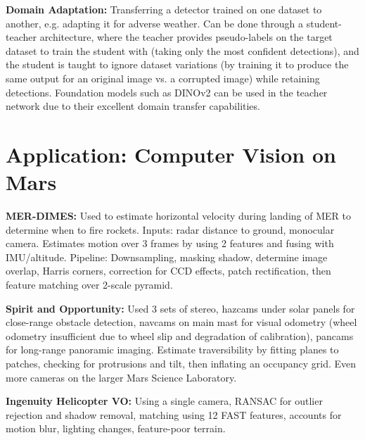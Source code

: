 \documentclass[twocolumn, 10pt]{extarticle}
\begin{document}
\textbf{Domain Adaptation:} Transferring a detector trained on one dataset to another, e.g. adapting it for adverse
weather. Can be done through a student-teacher architecture, where the teacher provides pseudo-labels on the target
dataset to train the student with (taking only the most confident detections), and the student is taught to ignore
dataset variations (by training it to produce the same output for an original image vs. a corrupted image) while
retaining detections. Foundation models such as DINOv2 can be used in the teacher network due to their excellent domain
transfer capabilities.

\section{Application: Computer Vision on Mars} %

\textbf{MER-DIMES:} Used to estimate horizontal velocity during landing of MER to determine when to fire rockets.
Inputs: radar distance to ground, monocular camera. Estimates motion over 3 frames by using 2 features and fusing with
IMU/altitude. Pipeline: Downsampling, masking shadow, determine image overlap, Harris corners, correction for CCD
effects, patch rectification, then feature matching over 2-scale pyramid.

\textbf{Spirit and Opportunity:} Used 3 sets of stereo, hazcams under solar panels for close-range obstacle detection,
navcams on main mast for visual odometry (wheel odometry insufficient due to wheel slip and degradation of calibration),
pancams for long-range panoramic imaging. Estimate traversibility by fitting planes to patches, checking for protrusions
and tilt, then inflating an occupancy grid. Even more cameras on the larger Mars Science Laboratory.

\textbf{Ingenuity Helicopter VO:} Using a single camera, RANSAC for outlier rejection and shadow removal, matching using 12 FAST
features, accounts for motion blur, lighting changes, feature-poor terrain.
\end{document}
